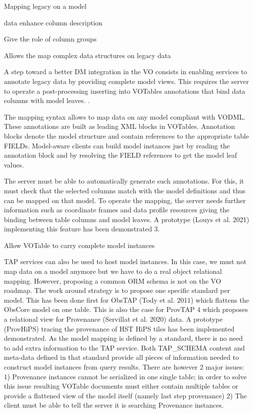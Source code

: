
Mapping legacy on a model

data enhance column description

Give the role of column groups

Allows the map complex data structures on legacy data


A step toward a better DM integration in the VO consists in enabling services to annotate
legacy data by providing complete model
views. This requires the server to operate a post-processing inserting into VOTables
annotations that bind data columns with model leaves. .

The mapping syntax allows to map data on any model compliant with VODML. 
These annotations are built as leading XML blocks in VOTables. 
Annotation blocks denote the model structure and contain references to the appropriate table
FIELDs. Model-aware clients can build model instances just by reading the annotation
block and by resolving the FIELD references to get the model leaf values. 

The server must be able to automatically generate such annotations. For this, it
must check that the selected columns match with the model definitions and thus can be
mapped on that model. To operate the mapping, the server needs further information
such as coordinate frames and data profile resources giving the binding between table
columns and model leaves. A prototype (Louys et al. 2021) implementing this feature
has been demonstrated 3.

Allow VOTable to carry complete model instances

TAP services can also be used to host model instances. In this case, we must not
map data on a model anymore but we have to do a real object relational mapping.
However, proposing a common ORM schema is not on the VO roadmap. The work
around strategy is to propose one specific standard per model. This has been done first
for ObsTAP (Tody et al. 2011) which flattens the ObsCore model on one table. This is
also the case for ProvTAP 4 which proposes a relational view for Provenance (Servillat
et al. 2020) data. A prototype (ProvHiPS) tracing the provenance of HST HiPS tiles
has been implemented demonstrated. As the model mapping is defined by a standard,
there is no need to add extra information to the TAP service. Both TAP_SCHEMA
content and meta-data defined in that standard provide all pieces of information needed
to construct model instances from query results. There are however 2 major issues: 1)
Provenance instances cannot be serialized in one single table; in order to solve this issue
resulting VOTable documents must either contain multiple tables or provide a flattened
view of the model itself (namely last step provenance) 2) The client must be able to tell
the server it is searching Provenance instances.